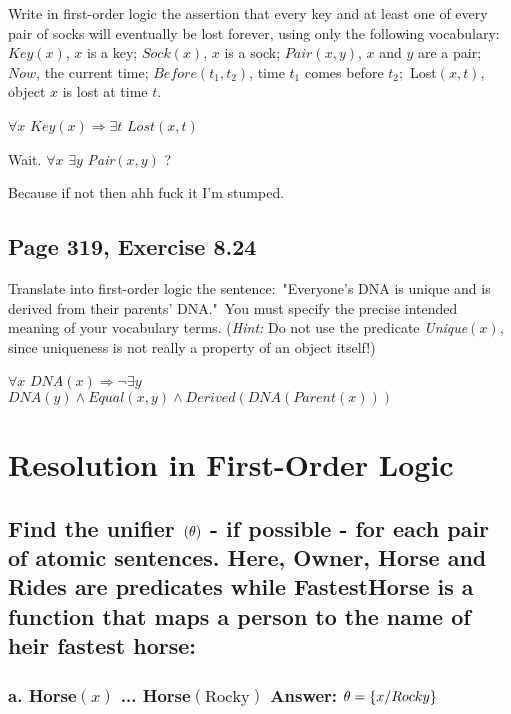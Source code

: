 \documentclass{article}
\begin{document}
Write in first-order logic the assertion that every key and at least one of
every pair of socks will eventually be lost forever, using only the
following vocabulary: $Key\left( x\right) $, $x$ is a key; $Sock\left(
x\right) $, $x$ is a sock; $Pair\left( x,y\right) $, $x$ and $y$ are a pair; 
$Now$, the current time; $Before\left( t_{1},t_{2}\right) $, time $t_{1}$
comes before $t_{2};$ Lost$\left( x,t\right) $, object $x$ is lost at time $%
t $.

$\forall x$ $Key\left( x\right) \Rightarrow \exists t$ $Lost\left(
x,t\right) $

Wait. $\forall x$ $\exists y$ \textit{Pair}$\left( x,y\right) $ ?

Because if not then ahh fuck it I'm stumped.

\subsection{Page 319, Exercise 8.24}

Translate into first-order logic the sentence:\ "Everyone's DNA is unique
and is derived from their parents' DNA."\ You must specify the precise
intended meaning of your vocabulary terms. (\textit{Hint:} Do not use the
predicate \textit{Unique}$\left( x\right) $, since uniqueness is not really
a property of an object itself!)

$\forall x$ $DNA\left( x\right) \Longrightarrow \lnot \exists y$ $DNA\left(
y\right) \wedge Equal\left( x,y\right) \wedge Derived\left( DNA\left(
Parent\left( x\right) \right) \right) $

\section{Resolution in First-Order Logic}

\subsection{Find the unifier $\left( \protect\theta \right) $ - if possible
- for each pair of atomic sentences. Here, Owner, Horse and Rides are
predicates while FastestHorse is a function that maps a person to the name
of heir fastest horse:}

\subsubsection{a. Horse$\left( x\right) $ ... Horse$\left( \text{Rocky}%
\right) $ Answer: $\protect\theta =\{x/Rocky\}$}
\end{document}
